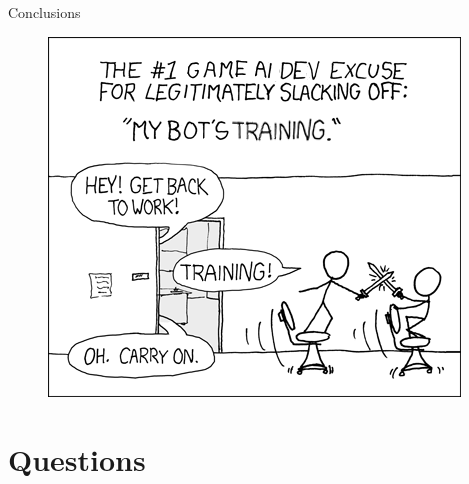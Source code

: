 \documentclass{beamer}
\begin{document}
\begin{frame}{Conclusions}
\begin{figure}[h]
\begin{minipage}[t]{0.55\textwidth}
		\includegraphics[width=\textwidth]{img/training}	   
    
  \end{minipage}
\end{figure}
\end{frame}

\section{Questions}
\end{document}
